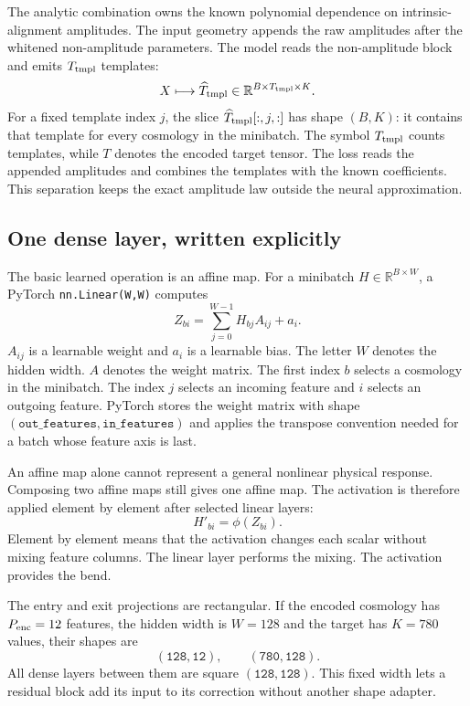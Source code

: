 \documentclass[10pt,aps,prd,twocolumn,nofootinbib]{revtex4-2}
\newcommand{\code}[1]{\texttt{#1}}
\newcommand{\shape}[1]{\ensuremath{\mathtt{#1}}}
\begin{document}
The analytic combination owns the known polynomial dependence on
intrinsic-alignment amplitudes.  The input geometry appends the raw amplitudes
after the whitened non-amplitude parameters.  The model reads the
non-amplitude block and emits $T_{\rm tmpl}$ templates:
\begin{equation*}
  X \longmapsto
  \widehat T_{\rm tmpl}
  \in\mathbb{R}^{B\times T_{\rm tmpl}\times K}.
\end{equation*}
For a fixed template index $j$, the slice
$\widehat T_{\rm tmpl}[:,j,:]$ has shape $(B,K)$: it contains that template
for every cosmology in the minibatch.  The symbol $T_{\rm tmpl}$ counts
templates, while $T$ denotes the encoded target tensor.
The loss reads the appended amplitudes and combines the templates with the
known coefficients.  This separation keeps the exact amplitude law outside
the neural approximation.

\subsection{One dense layer, written explicitly}

The basic learned operation is an affine map.  For a minibatch
$H\in\mathbb{R}^{B\times W}$, a PyTorch \code{nn.Linear(W,W)} computes
\begin{equation}
  Z_{bi}=\sum_{j=0}^{W-1}H_{bj}A_{ij}+a_i.
  \label{eq:linear}
\end{equation}
$A_{ij}$ is a learnable weight and $a_i$ is a learnable bias.  The letter
$W$ denotes the hidden width.  $A$ denotes the weight matrix.  The first
index $b$ selects a cosmology in the minibatch.  The index $j$ selects an
incoming feature and $i$ selects an outgoing feature.  PyTorch stores the
weight matrix with shape \shape{(out\_features,in\_features)} and applies the
transpose convention needed for a batch whose feature axis is last.

An affine map alone cannot represent a general nonlinear physical response.
Composing two affine maps still gives one affine map.  The activation is
therefore applied element by element after selected linear layers:
\begin{equation*}
  H'_{bi}=\phi(Z_{bi}).
\end{equation*}
Element by element means that the activation changes each scalar without
mixing feature columns.  The linear layer performs the mixing.  The activation
provides the bend.

The entry and exit projections are rectangular.  If the encoded cosmology
has $P_{\rm enc}=12$ features, the hidden width is $W=128$ and the target has
$K=780$ values, their shapes are
\begin{equation*}
  \shape{(128,12)},\qquad \shape{(780,128)}.
\end{equation*}
All dense layers between them are square \shape{(128,128)}.  This fixed width
lets a residual block add its input to its correction without another shape
adapter.
\end{document}
